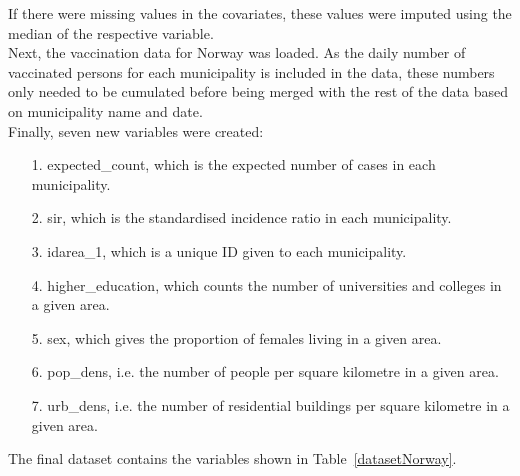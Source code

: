 If there were missing values in the covariates, these values were imputed using the median of the respective variable. \\
Next, the vaccination data for Norway was loaded. As the daily number of vaccinated persons for each municipality is included in the data, these numbers only needed to be cumulated before being merged with the rest of the data based on municipality name and date. \\
Finally, seven new variables were created:
\begin{itemize}
    \item[1.] expected\_count, which is the expected number of cases in each municipality.
    \item[2.] sir, which is the standardised incidence ratio in each municipality.
    \item[3.] idarea\_1, which is a unique ID given to each municipality.
    \item[4.] higher\_education, which counts the number of universities and colleges in a given area.
    \item[5.] sex, which gives the proportion of females living in a given area.
    \item[6.] pop\_dens, i.e. the number of people per square kilometre in a given area.
    \item[7.] urb\_dens, i.e. the number of residential buildings per square kilometre in a given area.
\end{itemize}
The final dataset contains the variables shown in Table~\ref{datasetNorway}.
